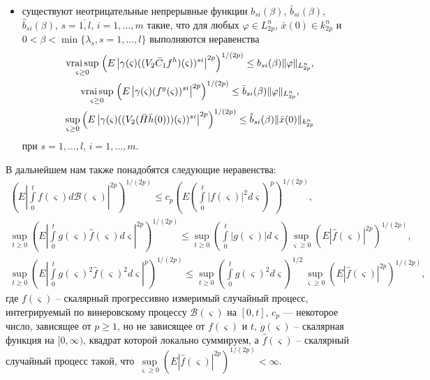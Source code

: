 \begin{itemize}
    \item  существуют неотрицательные непрерывные функции $b_{si}(\beta)$,
    $\bar b_{si}(\beta)$, $\hat b_{si}(\beta)$, $s= \overline{1, l}$, $i= 1,
    \dots, m$ такие,  что для любых $\varphi \in L^n_{2p}$, $\bar x(0) \in
    k_{2p}^n$ и  $0<\beta < \min \{\lambda _s, s = 1, \dots, l \}$
    выполняются неравенства
     \begin{gather*}
        \mathrel {\mathop
     {\operatorname*{vrai} \sup} \limits _{\varsigma \geq 0}} \left(E\left |\gamma (\varsigma )
    ((V_2 \bar C_1 f^h)(\varsigma))^{si}\right |^{2p}\right)^{1/(2p)}
    \leq b_{si}(\beta) \|\varphi \|_{L^n_{2p}}, \\
    \mathrel {\mathop
     {\operatorname*{vrai} \sup} \limits _{\varsigma \geq 0} }\left(E\left|\gamma (\varsigma )
    (f^y(\varsigma ))^{si}\right|^{2p}\right)^{1/(2p)}\leq \bar
    b_{si}(\beta) \|\varphi \|_{L^n_{2p}},\\
    \sup \limits _{\varsigma \geq 0}\left (E\left |\gamma (\varsigma)
    ((V_2(\bar H \bar h(0)))(\varsigma))^{si}\right |^{2p}\right
    )^{1/(2p)} \leq \hat b_{si}(\beta)\|\bar x(0)\|_{k^n_{2p}}
    \end{gather*}
    при $s = 1,\dots,l$, $i = 1, \dots, m$.
\end{itemize}

В дальнейшем нам также понадобятся следующие неравенства:\\
 \begin{gather*}
    \left (E\left |\int \limits _0^tf(\varsigma )d\mathcal B(\varsigma
    )\right |^{2p}\right )^{1/(2p)} \leq c_p \left (E\left (\int \limits
    _0^t|f(\varsigma )|^2d\varsigma\right )^p\right )^{1/(2p)},
    \\
     \sup \limits _{t \geq 0}\left(E\left|\int \limits
     _0^tg(\varsigma)\hat f(\varsigma)d\varsigma\right|^{2p}\right)^{1/(2p)}
     \leq \sup \limits _{t \geq 0}\left (\int \limits
     _0^t|g(\varsigma)|d\varsigma\right )
     \sup \limits _{\varsigma \geq
     0}\left (E\left |\hat f(\varsigma)\right |^{2p}\right )^{1/(2p)},
     \\
\sup \limits _{t \geq 0}\left(E|\int \limits
 _0^tg(\varsigma)^2\hat f(\varsigma)^2d\varsigma|^{p}\right)^{1/(2p)} \leq
 \sup \limits _{t \geq 0}\left(\int \limits
 _0^tg(\varsigma)^2d\varsigma\right)^{1/2}\sup \limits _{\varsigma
 \geq 0}\left (E\left |\hat f(\varsigma)\right |^{2p}\right )^{1/(2p)},
\end{gather*}
где $f(\varsigma )$ -- скалярный прогрессивно измеримый случайный
процесс, интегрируемый по винеровскому процессу  $\mathcal
B(\varsigma )$ на $[0, t]$, $c_p$ --- некоторое число, зависящее от
$p\ge 1$, но не зависящее от $f(\varsigma )$ и $t$, $g(\varsigma)$
-- скалярная функция на $[0,
 \infty)$, квадрат которой локально суммируем, а $\hat f(\varsigma)$ --
скалярный случайный процесс такой, что $\sup \limits _{\varsigma
\geq 0}\left (E\left |\hat f(\varsigma)\right |^{2p}\right
)^{1/(2p)} < \infty$.

